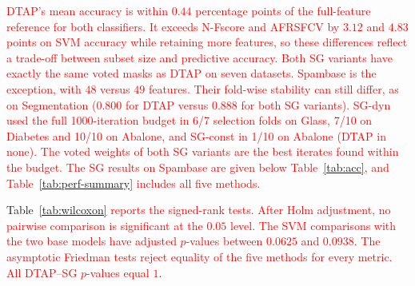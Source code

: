 \documentclass[]{interact}
\theoremstyle{plain}
\theoremstyle{definition}
\theoremstyle{remark}
\begin{document}
\leavevmode\textcolor{red}{DTAP's mean accuracy is within $0.44$ percentage points of the full-feature reference for both classifiers. It exceeds N-Fscore and AFRSFCV by $3.12$ and $4.83$ points on SVM accuracy while retaining more features, so these differences reflect a trade-off between subset size and predictive accuracy. Both SG variants have exactly the same voted masks as DTAP on seven datasets. Spambase is the exception, with $48$ versus $49$ features. Their fold-wise stability can still differ, as on Segmentation ($0.800$ for DTAP versus $0.888$ for both SG variants). SG-dyn used the full 1000-iteration budget in 6/7 selection folds on Glass, 7/10 on Diabetes and 10/10 on Abalone, and SG-const in 1/10 on Abalone (DTAP in none). The voted weights of both SG variants are the best iterates found within the budget. The SG results on Spambase are given below Table~\ref{tab:acc}, and Table~\ref{tab:perf-summary} includes all five methods.}

Table~\leavevmode\textcolor{red}{\ref{tab:wilcoxon} reports the signed-rank tests. After Holm adjustment, no pairwise comparison is significant at the $0.05$ level. The SVM comparisons with the two base models have adjusted $p$-values between $0.0625$ and $0.0938$. The asymptotic Friedman tests reject equality of the five methods for every metric. All DTAP--SG $p$-values equal $1$}.
\end{document}
